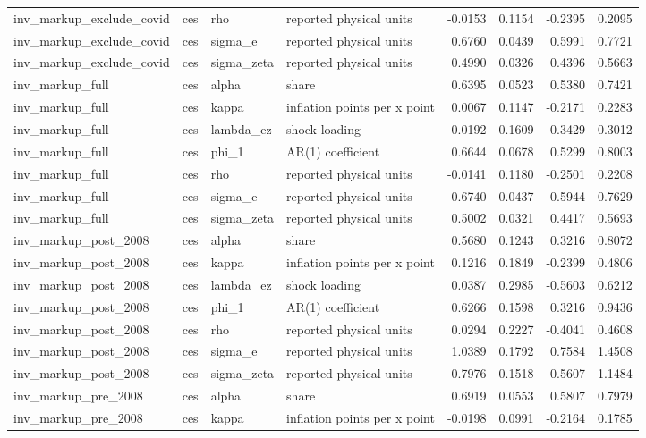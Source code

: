 \begin{tabular}{llllrrrr}
inv\_markup\_exclude\_covid & ces & rho & reported physical units & -0.0153 & 0.1154 & -0.2395 & 0.2095 \\
inv\_markup\_exclude\_covid & ces & sigma\_e & reported physical units & 0.6760 & 0.0439 & 0.5991 & 0.7721 \\
inv\_markup\_exclude\_covid & ces & sigma\_zeta & reported physical units & 0.4990 & 0.0326 & 0.4396 & 0.5663 \\
inv\_markup\_full & ces & alpha & share & 0.6395 & 0.0523 & 0.5380 & 0.7421 \\
inv\_markup\_full & ces & kappa & inflation points per x point & 0.0067 & 0.1147 & -0.2171 & 0.2283 \\
inv\_markup\_full & ces & lambda\_ez & shock loading & -0.0192 & 0.1609 & -0.3429 & 0.3012 \\
inv\_markup\_full & ces & phi\_1 & AR(1) coefficient & 0.6644 & 0.0678 & 0.5299 & 0.8003 \\
inv\_markup\_full & ces & rho & reported physical units & -0.0141 & 0.1180 & -0.2501 & 0.2208 \\
inv\_markup\_full & ces & sigma\_e & reported physical units & 0.6740 & 0.0437 & 0.5944 & 0.7629 \\
inv\_markup\_full & ces & sigma\_zeta & reported physical units & 0.5002 & 0.0321 & 0.4417 & 0.5693 \\
inv\_markup\_post\_2008 & ces & alpha & share & 0.5680 & 0.1243 & 0.3216 & 0.8072 \\
inv\_markup\_post\_2008 & ces & kappa & inflation points per x point & 0.1216 & 0.1849 & -0.2399 & 0.4806 \\
inv\_markup\_post\_2008 & ces & lambda\_ez & shock loading & 0.0387 & 0.2985 & -0.5603 & 0.6212 \\
inv\_markup\_post\_2008 & ces & phi\_1 & AR(1) coefficient & 0.6266 & 0.1598 & 0.3216 & 0.9436 \\
inv\_markup\_post\_2008 & ces & rho & reported physical units & 0.0294 & 0.2227 & -0.4041 & 0.4608 \\
inv\_markup\_post\_2008 & ces & sigma\_e & reported physical units & 1.0389 & 0.1792 & 0.7584 & 1.4508 \\
inv\_markup\_post\_2008 & ces & sigma\_zeta & reported physical units & 0.7976 & 0.1518 & 0.5607 & 1.1484 \\
inv\_markup\_pre\_2008 & ces & alpha & share & 0.6919 & 0.0553 & 0.5807 & 0.7979 \\
inv\_markup\_pre\_2008 & ces & kappa & inflation points per x point & -0.0198 & 0.0991 & -0.2164 & 0.1785 \\

\end{tabular}
